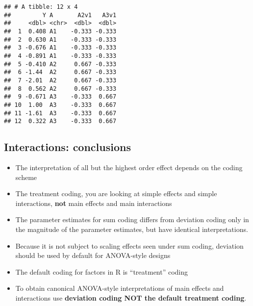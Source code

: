 \documentclass[
]{article}
\providecommand{\tightlist}{%
  \setlength{\itemsep}{0pt}\setlength{\parskip}{0pt}}
\begin{document}
\begin{verbatim}
## # A tibble: 12 x 4
##         Y A       A2v1   A3v1
##     <dbl> <chr>  <dbl>  <dbl>
##  1  0.408 A1    -0.333 -0.333
##  2  0.630 A1    -0.333 -0.333
##  3 -0.676 A1    -0.333 -0.333
##  4 -0.891 A1    -0.333 -0.333
##  5 -0.410 A2     0.667 -0.333
##  6 -1.44  A2     0.667 -0.333
##  7 -2.01  A2     0.667 -0.333
##  8  0.562 A2     0.667 -0.333
##  9 -0.671 A3    -0.333  0.667
## 10  1.00  A3    -0.333  0.667
## 11 -1.61  A3    -0.333  0.667
## 12  0.322 A3    -0.333  0.667
\end{verbatim}

\hypertarget{interactions-conclusions}{%
\subsection{Interactions: conclusions}\label{interactions-conclusions}}

\begin{itemize}
\tightlist
\item
  The interpretation of all but the highest order effect depends on the
  coding scheme
\item
  The treatment coding, you are looking at simple effects and simple
  interactions, \textbf{not} main effects and main interactions
\item
  The parameter estimates for sum coding differs from deviation coding
  only in the magnitude of the parameter estimates, but have identical
  interpretations.
\item
  Because it is not subject to scaling effects seen under sum coding,
  deviation should be used by default for ANOVA-style designs
\item
  The default coding for factors in R is ``treatment'' coding
\item
  To obtain canonical ANOVA-style interpretations of main effects and
  interactions use \textbf{deviation coding NOT the default treatment
  coding}.
\end{itemize}
\end{document}
